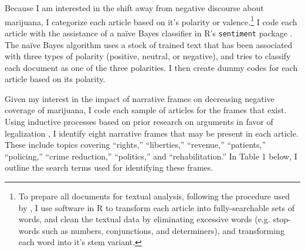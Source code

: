 Because I am interested in the shift away from negative discourse about marijuana, I categorize each article based on it's polarity or valence.\footnote{To prepare all documents for textual analysis, following the procedure used by \citet{bail_2012}, I use software in R to transform each article into fully-searchable sets of words, and clean the textual data by eliminating excessive words (e.g. stop-words such as numbers, conjunctions, and determiners), and transforming each word into it's stem variant.} I code each article with the assistance of a na\"{i}ve Bayes classifier in R's \texttt{sentiment} package \citep{jurka_2012}. The na\"{i}ve Bayes algorithm uses a stock of trained text that has been associated with three types of polarity (positive, neutral, or negative), and tries to classify each document as one of the three polarities. I then create dummy codes for each article based on its polarity. 






Given my interest in the impact of narrative frames on decreasing negative coverage of marijuana, I code each sample of articles for the frames that exist. Using inductive processes based on prior research on arguments in favor of legalization \citep{newhart_and_dolphin_2018}, I identify eight narrative frames that may be present in each article. These include topics covering ``rights,'' ``liberties,'' ``revenue,'' ``patients,'' ``policing,'' ``crime reduction,'' ``politics,'' and ``rehabilitation.'' In Table 1 below, I outline the search terms used for identifying these frames. 

